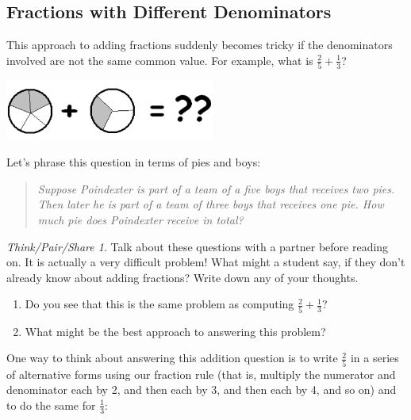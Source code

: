 \documentclass[10pt, reqno]{amsart}
\theoremstyle{remark}
\newtheorem*{thinkpair*}{Think/Pair/Share}
\theoremstyle{definition}
\numberwithin{equation}{section}  %
\begin{document}
\subsection{Fractions with Different Denominators}

This approach to adding fractions suddenly becomes tricky if the denominators
involved are not the same common value. For example, what is
$\frac 2 5 + \frac 1 3$?

   \begin{center}
\includegraphics[height = 2cm]{addingfrac1}
\end{center}


Let's phrase this question in terms of pies and boys:

\begin{quotation}
\emph{Suppose Poindexter is part of a team of a five boys that receives two pies.
Then later he is part of a team of three boys that receives one pie. How much pie does
Poindexter receive in total?}
\end{quotation}

\begin{thinkpair*}
Talk about these questions with a partner before reading on. It is actually a very difficult problem!  What might a student say, if they don't already know about adding fractions?  Write down any of your thoughts.
\begin{enumerate}
\item
Do you see that this is the same problem as computing $ \frac 2 5 + \frac 1 3$?
\item
What might be the best approach to answering this problem?
\end{enumerate}

\end{thinkpair*}



One way to think about answering this addition question is to write
$\frac 2 5$
in a series of
alternative forms using our fraction rule (that is, multiply the numerator and
denominator each by 2, and then each by 3, and then each by 4, and so on) and to do
the same for
$\frac 1 3$:
\end{document}
